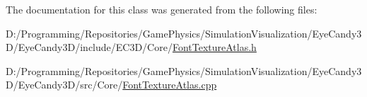 The documentation for this class was generated from the following files\+:\begin{DoxyCompactItemize}
\item 
D\+:/\+Programming/\+Repositories/\+Game\+Physics/\+Simulation\+Visualization/\+Eye\+Candy3\+D/\+Eye\+Candy3\+D/include/\+E\+C3\+D/\+Core/\mbox{\hyperlink{_font_texture_atlas_8h}{Font\+Texture\+Atlas.\+h}}\item 
D\+:/\+Programming/\+Repositories/\+Game\+Physics/\+Simulation\+Visualization/\+Eye\+Candy3\+D/\+Eye\+Candy3\+D/src/\+Core/\mbox{\hyperlink{_font_texture_atlas_8cpp}{Font\+Texture\+Atlas.\+cpp}}\end{DoxyCompactItemize}
